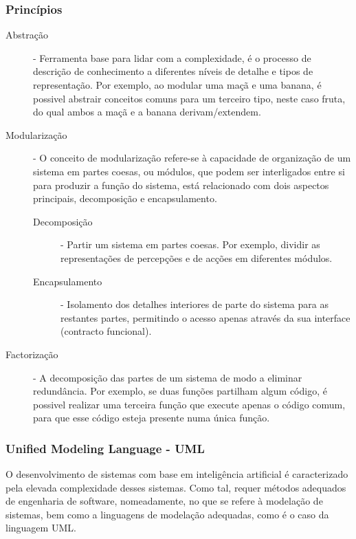 \documentclass[a4paper,12pt]{article}
\begin{document}
\subsubsection{Princípios}
\begin{description}
	\item[Abstração] - Ferramenta base para lidar com a complexidade, é o processo de descrição de conhecimento a diferentes níveis de detalhe e tipos de representação. Por exemplo, ao modular uma maçã e uma banana, é possivel abstrair conceitos comuns para um terceiro tipo, neste caso fruta, do qual ambos a maçã e a banana derivam/extendem.
	\item[Modularização] - O conceito de modularização refere-se à capacidade de organização de um sistema em partes coesas, ou módulos, que podem ser interligados entre si para produzir a função do sistema, está relacionado com dois aspectos principais, decomposição e encapsulamento.
		\begin{description}
			\item[Decomposição] - Partir um sistema em partes coesas. Por exemplo, dividir as representações de percepções e de acções em diferentes módulos.
			\item[Encapsulamento] - Isolamento dos detalhes interiores de parte do sistema para as restantes partes, permitindo o acesso apenas através da sua interface (contracto funcional).
		\end{description}
	\item[Factorização] - A decomposição das partes de um sistema de modo a eliminar redundância. Por exemplo, se duas funções partilham algum código, é possivel realizar uma terceira função que execute apenas o código comum, para que esse código esteja presente numa única função.
\end{description}

\subsubsection{Unified Modeling Language - UML}
O desenvolvimento de sistemas com base em inteligência artificial é caracterizado pela elevada complexidade desses sistemas. Como tal, requer métodos adequados de engenharia de software, nomeadamente, no que se
refere à modelação de sistemas, bem como a linguagens de modelação adequadas, como é o caso da linguagem UML.
\end{document}
